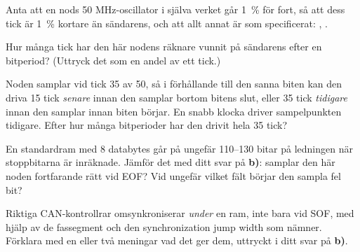 Anta att en nods 50 MHz-oscillator i själva verket går 1~\% för fort, så att dess tick är 1~\%
kortare än sändarens, och att allt annat är som specificerat: ,
.

 Hur många tick har den här nodens räknare vunnit på sändarens efter en bitperiod? (Uttryck
det som en andel av ett tick.)

 Noden samplar vid tick 35 av 50, så i förhållande till den sanna biten kan den driva 15
tick \emph{senare} innan den samplar bortom bitens slut, eller 35 tick \emph{tidigare} innan den
samplar innan biten börjar. En snabb klocka driver sampelpunkten tidigare. Efter hur många
bitperioder har den drivit hela 35 tick?

 En standardram med 8 databytes går på ungefär 110--130 bitar på ledningen när stoppbitarna
är inräknade. Jämför det med ditt svar på \textbf{b)}: samplar den här noden fortfarande rätt vid
EOF? Vid ungefär vilket fält börjar den sampla fel bit?

 Riktiga CAN-kontrollrar omsynkroniserar \emph{under} en ram, inte bara vid SOF, med hjälp
av de fassegment och den synchronization jump width som  nämner. Förklara
med en eller två meningar vad det ger dem, uttryckt i ditt svar på \textbf{b)}.
